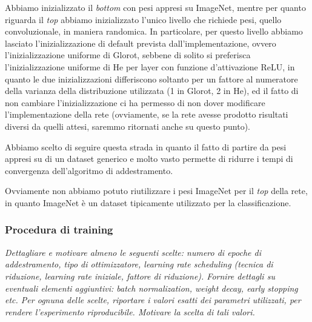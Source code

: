 Abbiamo inizializzato il \emph{bottom} con pesi appresi su ImageNet\cite{imagenet}, mentre per quanto riguarda il \emph{top} abbiamo inizializzato l'unico livello che richiede pesi, quello convoluzionale, in maniera randomica. In particolare, per questo livello abbiamo lasciato l'inizializzazione di default prevista dall'implementazione, ovvero l'inizializzazione uniforme di Glorot, sebbene di solito si preferisca l'inizializzazione uniforme di He per layer con funzione d'attivazione ReLU, in quanto le due inizializzazioni differiscono soltanto per un fattore al numeratore della varianza della distribuzione utilizzata (1 in Glorot, 2 in He), ed il fatto di non cambiare l'inizializzazione ci ha permesso di non dover modificare l'implementazione della rete (ovviamente, se la rete avesse prodotto risultati diversi da quelli attesi, saremmo ritornati anche su questo punto).

Abbiamo scelto di seguire questa strada in quanto il fatto di partire da pesi appresi su di un dataset generico e molto vasto permette di ridurre i tempi di convergenza dell'algoritmo di addestramento\cite{miviaage}. 

Ovviamente non abbiamo potuto riutilizzare i pesi ImageNet per il \emph{top} della rete, in quanto ImageNet è un dataset tipicamente utilizzato per la classificazione.

\subsubsection{Procedura di training}
\emph{Dettagliare e motivare almeno le seguenti scelte: numero di epoche di addestramento, tipo di ottimizzatore, learning rate scheduling (tecnica di riduzione, learning rate iniziale, fattore di riduzione). Fornire dettagli su eventuali elementi aggiuntivi: batch normalization, weight decay, early stopping etc. Per ognuna delle scelte, riportare i valori esatti dei parametri utilizzati, per rendere l’esperimento riproducibile. Motivare la scelta di tali valori.}

